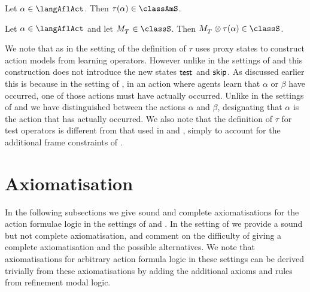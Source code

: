 \begin{lemma}\label{afl-s-structure}
Let $\alpha \in \langAflAct$. Then $\tau(\alpha) \in \classAmS$.
\end{lemma}

\begin{lemma}\label{afl-s-exec}
Let $\alpha \in \langAflAct$ and 
let $\kPModel{\kStatesT} \in \classS$.
Then $\kPModel{\kStatesT} \exec \tau(\alpha) \in \classS$.
\end{lemma}

We note that as in the setting of \classKFF{} the definition of $\tau$ uses proxy states to construct action models from learning operators.
However unlike in the settings of \classK{} and \classKFF{} this construction does not introduce the new states $\aStateTest$ and $\aStateSkip$.
As discussed earlier this is because in the setting of \classS{}, in an action where agents learn that $\alpha$ or $\beta$ have occurred, one of those actions must have actually occurred.
Unlike in the settings of \classK{} and \classKFF{} we have distinguished between the actions $\alpha$ and $\beta$, designating that $\alpha$ is the action that has actually occurred.
We also note that the definition of $\tau$ for test operators is different from that used in \classK{} and \classKFF{}, simply to account for the additional frame constraints of \classS{}.

\section{Axiomatisation}\label{aafl-axiomatisation}

In the following subsections we give sound and complete axiomatisations for the action formulae logic in the settings of \classK{} and \classKFF{}.
In the setting of \classS{} we provide a sound but not complete axiomatisation, and comment on the difficulty of giving a complete axiomatisation and the possible alternatives.
We note that axiomatisations for arbitrary action formula logic in these settings can be derived trivially from these axiomatisations by adding the additional axioms and rules from refinement modal logic.

\subsection{\classK{}}

